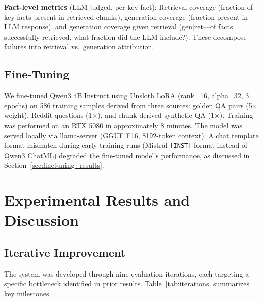 \documentclass{article}
\begin{document}
\textbf{Fact-level metrics} (LLM-judged, per key fact): Retrieval coverage (fraction of key facts present in retrieved chunks), generation coverage (fraction present in LLM response), and generation coverage given retrieval (gen$|$ret---of facts successfully retrieved, what fraction did the LLM include?). These decompose failures into retrieval vs.\ generation attribution.

\subsection{Fine-Tuning}
\label{sec:finetuning}

We fine-tuned Qwen3 4B Instruct using Unsloth LoRA (rank=16, alpha=32, 3 epochs) on 586 training samples derived from three sources: golden QA pairs (5$\times$ weight), Reddit questions (1$\times$), and chunk-derived synthetic QA (1$\times$). Training was performed on an RTX 5080 in approximately 8 minutes. The model was served locally via llama-server (GGUF F16, 8192-token context). A chat template format mismatch during early training runs (Mistral \texttt{[INST]} format instead of Qwen3 ChatML) degraded the fine-tuned model's performance, as discussed in Section~\ref{sec:finetuning_results}.

\section{Experimental Results and Discussion}
\label{sec:results}

\subsection{Iterative Improvement}
\label{sec:iterations}

The system was developed through nine evaluation iterations, each targeting a specific bottleneck identified in prior results. Table~\ref{tab:iterations} summarizes key milestones.
\end{document}
